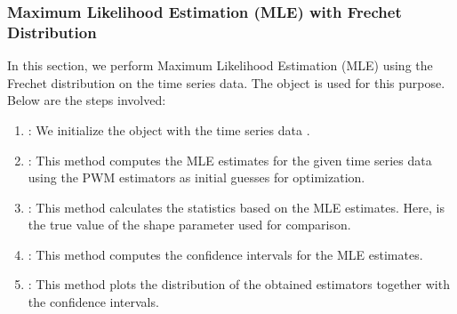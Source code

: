 \documentclass[a4paper,11pt,openany,english]{sphinxmanual}
\begin{document}
\subsubsection{Maximum Likelihood Estimation (MLE) with Frechet Distribution}
\label{\detokenize{notebooks/estimators:Maximum-Likelihood-Estimation-(MLE)-with-Frechet-Distribution}}
\sphinxAtStartPar
In this section, we perform Maximum Likelihood Estimation (MLE) using the Frechet distribution on the time series data. The  object is used for this purpose. Below are the steps involved:
\begin{enumerate}
%
\item {} 
\sphinxAtStartPar
{}:  We initialize the  object with the time series data .

\item {} 
\sphinxAtStartPar
{}:  This method computes the MLE estimates for the given time series data using the PWM estimators as initial guesses for optimization.

\item {} 
\sphinxAtStartPar
{}:  This method calculates the statistics based on the MLE estimates. Here,  is the true value of the shape parameter used for comparison.

\item {} 
\sphinxAtStartPar
{}:  This method computes the confidence intervals for the MLE estimates.

\item {} 
\sphinxAtStartPar
{}:  This method plots the distribution of the obtained estimators together with the confidence intervals.

\end{enumerate}
\end{document}
